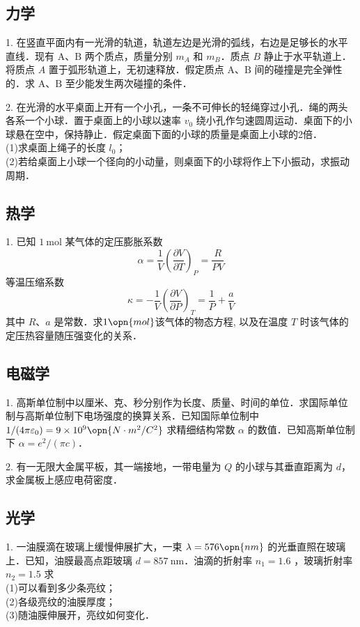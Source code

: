 
\subsection{力学}
1. 在竖直平面内有一光滑的轨道，轨道左边是光滑的弧线，右边是足够长的水平直线．现有 $\mathrm{A}$、$\mathrm{B}$ 两个质点，质量分别 $m_{A}$ 和 $m_B$．质点 $B$ 静止于水平轨道上．将质点 $A$ 置于弧形轨道上，无初速释放．假定质点 $\mathrm{A}$、$\mathrm{B}$ 间的碰撞是完全弹性的．求 $\mathrm{A}$、$\mathrm{B}$ 至少能发生两次碰撞的条件．

2. 在光滑的水平桌面上开有一个小孔，一条不可伸长的轻绳穿过小孔．绳的两头各系一个小球．置于桌面上的小球以速率 $v_{0}$ 绕小孔作匀速圆周运动．桌面下的小球悬在空中，保持静止．假定桌面下面的小球的质量是桌面上小球的2倍．\\
(1)求桌面上绳子的长度 $l_{0}$；\\
(2)若给桌面上小球一个径向的小动量，则桌面下的小球将作上下小振动，求振动周期．
\subsection{热学}
1. 已知 $1 \mathrm{~mol}$ 某气体的定压膨胀系数
\begin{equation}
\alpha=\frac{1}{V}\left(\frac{\partial V}{\partial T}\right)_{P}=\frac{R}{P V}
\end{equation}
等温压缩系数 
\begin{equation}
\kappa=-\frac{1}{V}\left(\frac{\partial V}{\partial P}\right)_{T}=\frac{1}{P}+\frac{a}{V}
\end{equation}
其中 $R$、$a$ 是常数．求$1\opn{mol}$该气体的物态方程, 以及在温度 $T$ 时该气体的定压热容量随压强变化的关系．
\subsection{电磁学}
1. 高斯单位制中以厘米、克、秒分别作为长度、质量、时间的单位．求国际单位制与高斯单位制下电场强度的换算关系．已知国际单位制中 $1/(4 \pi \varepsilon_{0})=9 \times 10^{9} \opn{N \cdot m^{2}/C^{2}}$ 求精细结构常数 $\alpha$ 的数值．已知高斯单位制下 $\alpha=e^{2}/(\pi c)$．

2. 有一无限大金属平板，其一端接地，一带电量为 $Q$ 的小球与其垂直距离为 $d$，求金属板上感应电荷密度．
\subsection{光学}
1. 一油膜滴在玻璃上缓慢伸展扩大，一束 $\lambda=576 \opn{nm}$ 的光垂直照在玻璃上．已知，油膜最高点距玻璃 $d=857 \mathrm{~nm}$．油滴的折射率 $n_{1}=1.6$ ，玻璃折射率 $n_{2}=1.5$ 求\\
(1)可以看到多少条亮纹；\\
(2)各级亮纹的油膜厚度；\\
(3)随油膜伸展开，亮纹如何变化．
